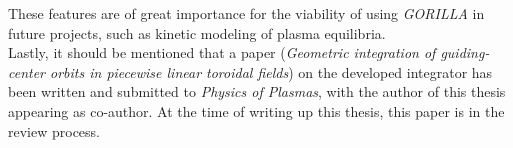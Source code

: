 \documentclass[./main.tex]{subfiles}
\begin{document}
These features are of great importance for the viability of using \textit{GORILLA} in future projects, such as kinetic modeling of plasma equilibria.\\
Lastly, it should be mentioned that a paper (\textit{Geometric integration of guiding-center orbits in piecewise linear toroidal fields}) on the developed integrator has been written and submitted to \textit{Physics of Plasmas}, with the author of this thesis appearing as co-author. At the time of writing up this thesis, this paper is in the review process.

\newpage
\end{document}
